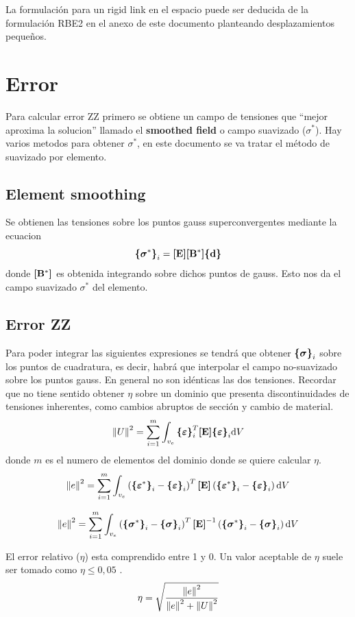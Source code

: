 La formulación para un rigid link en el espacio puede ser deducida de la formulación RBE2 en el anexo de este documento planteando desplazamientos pequeños.

\section{Error}

Para calcular error ZZ primero se obtiene un campo de tensiones que ``mejor aproxima la solucion''{} llamado el \textbf{smoothed field} o campo suavizado ($\sigma^*$). Hay varios metodos para obtener $\sigma^*$, en este documento se va tratar el método de suavizado por elemento.

\subsection*{Element smoothing}
Se obtienen las tensiones sobre los puntos gauss superconvergentes mediante la ecuacion
\[
 \boldsymbol{\{ }\mathbf{\boldsymbol{\sigma}^*} \boldsymbol{\}}_i = \boldsymbol{[}\mathbf{E} \boldsymbol{]} \boldsymbol{[}\mathbf{B^*} \boldsymbol{]} \boldsymbol{\{ }\mathbf{d} \boldsymbol{\}}
\]
donde $\boldsymbol{[}\mathbf{B^*} \boldsymbol{]}$ es obtenida integrando sobre dichos puntos de gauss. Esto nos da el campo suavizado $\sigma^*$ del elemento. 

\subsection*{Error ZZ}
Para poder integrar las siguientes expresiones se tendrá que obtener $\boldsymbol{\{ }\mathbf{\boldsymbol{\sigma}} \boldsymbol{\}}_i$ sobre los puntos de cuadratura, es decir, habrá que interpolar el campo no-suavizado sobre los puntos gauss. En general no son idénticas las dos tensiones. Recordar que no tiene sentido obtener $\eta$ sobre un dominio que presenta discontinuidades de tensiones inherentes, como cambios abruptos de sección y cambio de material.
\[
\left\Vert U\right\Vert^2 = \sum^m_{i=1}\int_{v_e} \boldsymbol{\{ }\mathbf{\boldsymbol{\varepsilon}} \boldsymbol{\}}_i^T \boldsymbol{[}\mathbf{E} \boldsymbol{]} \boldsymbol{\{ }\mathbf{\boldsymbol{\varepsilon}} \boldsymbol{\}}_i \textrm{d} V
\]
donde $m$ es el numero de elementos del dominio donde se quiere calcular $\eta$.
\[
\left\Vert e\right\Vert^2=\sum_{i=1}^m \int_{v_e} \left( \boldsymbol{\{ }\mathbf{\boldsymbol{\varepsilon}^*} \boldsymbol{\}}_i - \boldsymbol{\{ }\mathbf{\boldsymbol{\varepsilon}} \boldsymbol{\}}_i\right)^T \boldsymbol{[}\mathbf{E} \boldsymbol{]} \left( \boldsymbol{\{ }\mathbf{\boldsymbol{\varepsilon}^*} \boldsymbol{\}}_i - \boldsymbol{\{ }\mathbf{\boldsymbol{\varepsilon}} \boldsymbol{\}}_i\right) \textrm{d} V
\]

\[
\left\Vert e\right\Vert^2=\sum_{i=1}^m \int_{v_e} \left( \boldsymbol{\{ }\mathbf{\boldsymbol{\sigma}^*} \boldsymbol{\}}_i - \boldsymbol{\{ }\mathbf{\boldsymbol{\sigma}} \boldsymbol{\}}_i\right)^T \boldsymbol{[}\mathbf{E} \boldsymbol{]} ^{-1} \left( \boldsymbol{\{ }\mathbf{\boldsymbol{\sigma}^*} \boldsymbol{\}}_i - \boldsymbol{\{ }\mathbf{\boldsymbol{\sigma}} \boldsymbol{\}}_i\right) \textrm{d} V
\]

El error relativo ($\eta$) esta comprendido entre 1 y 0. Un valor aceptable de $\eta$ suele ser tomado como $\eta\leq 0,05$ \citep{cook2007concepts}.
\[
\eta = \sqrt{\frac{\left\Vert e\right\Vert^2}{\left\Vert e\right\Vert^2+\left\Vert U\right\Vert^2}}
\]


